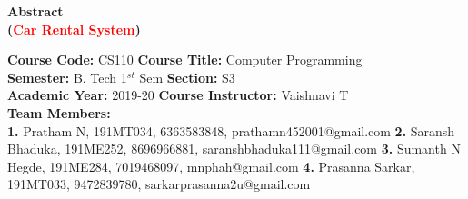 \documentclass[12pt]{article}
\begin{document}


\begin{center}
    \textbf{\Large{Abstract \\
    (\textcolor{red}{Car Rental System})}}
\end{center}

\noindent 
\textbf{Course Code:} CS110 
\hspace{2in} 
\textbf{Course Title:} Computer Programming \\
\textbf{Semester:} B. Tech 1$^{st}$ Sem 
\hspace{1.6in} 
\textbf{Section:} S3 \\
\textbf{Academic Year:} 2019-20 
\hspace{1.8in} 
\textbf{Course Instructor:} Vaishnavi T \\
\textbf{Team Members:} \\
\textbf{1.} Pratham N, 191MT034, 6363583848, prathamn452001@gmail.com 
\newline
\textbf{2.} Saransh Bhaduka, 191ME252, 8696966881, saranshbhaduka111@gmail.com
\newline
\textbf{3.} Sumanth N Hegde, 191ME284, 7019468097, mnphah@gmail.com
\newline
\textbf{4.} Prasanna Sarkar, 191MT033, 9472839780, sarkarprasanna2u@gmail.com

\vspace{0.25in}
\end{document}
